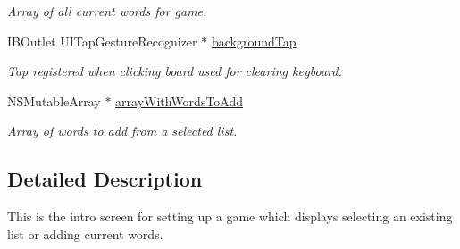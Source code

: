 \begin{DoxyCompactItemize}
\begin{DoxyCompactList}\small\item\em Array of all current words for game. \end{DoxyCompactList}\item 
\hypertarget{interface_game_creation_view_controller_a1489f19d881cf6dbac322fd31f15376b}{I\+B\+Outlet U\+I\+Tap\+Gesture\+Recognizer $\ast$ \hyperlink{interface_game_creation_view_controller_a1489f19d881cf6dbac322fd31f15376b}{background\+Tap}}\label{interface_game_creation_view_controller_a1489f19d881cf6dbac322fd31f15376b}

\begin{DoxyCompactList}\small\item\em Tap registered when clicking board used for clearing keyboard. \end{DoxyCompactList}\item 
\hypertarget{interface_game_creation_view_controller_a1a79edba7d0261936fbaea79a3ce49cf}{N\+S\+Mutable\+Array $\ast$ \hyperlink{interface_game_creation_view_controller_a1a79edba7d0261936fbaea79a3ce49cf}{array\+With\+Words\+To\+Add}}\label{interface_game_creation_view_controller_a1a79edba7d0261936fbaea79a3ce49cf}

\begin{DoxyCompactList}\small\item\em Array of words to add from a selected list. \end{DoxyCompactList}\end{DoxyCompactItemize}


\subsection{Detailed Description}
This is the intro screen for setting up a game which displays selecting an existing list or adding current words. 

